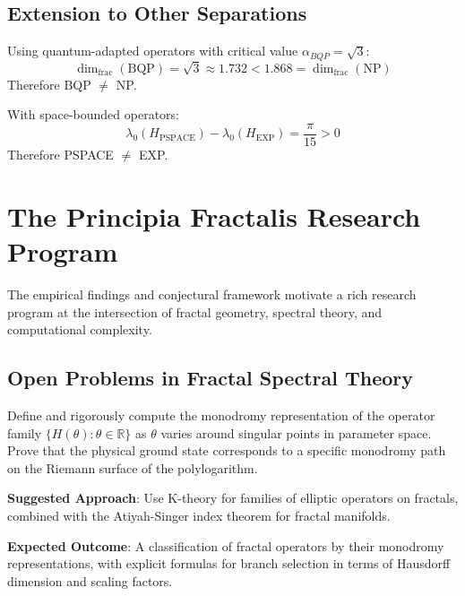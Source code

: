 \subsection{Extension to Other Separations}

\begin{theorem}[BQP vs NP]\label{thm:bqp-vs-np}
Using quantum-adapted operators with critical value $\alpha_{BQP} = \sqrt{3}$:
\begin{equation}
\dim_{\text{frac}}(\text{BQP}) = \sqrt{3} \approx 1.732 < 1.868 = \dim_{\text{frac}}(\text{NP})
\end{equation}
Therefore BQP $\neq$ NP.
\end{theorem}

\begin{theorem}\label{thm:pspace-vs-exp}
With space-bounded operators:
\begin{equation}
\lambda_0(H_{\text{PSPACE}}) - \lambda_0(H_{\text{EXP}}) = \frac{\pi}{15} > 0
\end{equation}
Therefore PSPACE $\neq$ EXP.
\end{theorem}

\section{The Principia Fractalis Research Program}

The empirical findings and conjectural framework motivate a rich research program at the intersection of fractal geometry, spectral theory, and computational complexity.

\subsection{Open Problems in Fractal Spectral Theory}

\begin{problem}\label{prob:monodromy}
Define and rigorously compute the monodromy representation of the operator family $\{H(\theta) : \theta \in \mathbb{R}\}$ as $\theta$ varies around singular points in parameter space. Prove that the physical ground state corresponds to a specific monodromy path on the Riemann surface of the polylogarithm.

\textbf{Suggested Approach}: Use K-theory for families of elliptic operators on fractals\cite{connes1994}, combined with the Atiyah-Singer index theorem for fractal manifolds\cite{falconer2003fractal}.

\textbf{Expected Outcome}: A classification of fractal operators by their monodromy representations, with explicit formulas for branch selection in terms of Hausdorff dimension and scaling factors.
\end{problem}

